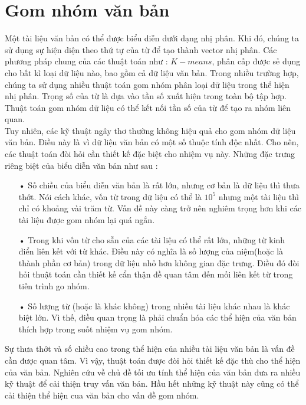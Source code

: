 \section{Gom nhóm văn bản}
\hspace{10mm}Một tài liệu văn bản có thể được biểu diễn dưới dạng nhị phân. Khi đó, chúng ta sử dụng sự hiện diện theo thứ tự của từ để tạo thành vector nhị phân. Các phương pháp chung của các thuật toán như : $K-means$, phân cấp được sẻ dụng cho bất kì loại dữ liệu nào, bao gồm cả dữ liệu văn bản. Trong nhiều trường hợp, chúng ta sử dụng nhiều thuật toán gom nhóm phân loại dữ liệu trong thể hiện nhị phân. Trọng số của từ là dựa vào tần số xuất hiện trong toàn bộ tập hợp. Thuật toán gom nhóm dữ liệu có thể kết nối tần số của từ để tạo ra nhóm liên quan.\\
\hspace*{10mm}Tuy nhiên, các kỹ thuật ngây thơ thường không hiệu quả cho gom nhóm dữ liệu văn bản. Điều này là vì dữ liệu văn bản có một số thuộc tính độc nhất. Cho nên, các thuật toán đòi hỏi cần thiết kế đặc biệt cho nhiệm vụ này. Những đặc trưng riêng biệt của biểu diễn văn bản như sau : 
\begin{enumerate}
\item[•]Số chiều của biểu diễn văn bản là rất lớn, nhưng cơ bản là dữ liệu thì thưa thớt. Nói cách khác, vốn từ trong dữ liệu có thể là $10^5$ nhưng một tài liệu thì chỉ có khoảng vài trăm từ. Vấn đề này càng trở nên nghiêm trọng hơn khi các tài liệu được gom nhóm lại quá ngắn.
\item[•]Trong khi vốn từ cho sẵn của các tài liệu có thể rất lớn, những từ kinh điển liên kết với từ khác. Điều này có nghĩa là số lượng của niệm(hoặc là thành phần cơ bản) trong dữ liệu nhỏ hơn không gian đặc trưng. Điều đó đòi hỏi thuật toán cần thiết kế cẩn thận đề quan tâm đến mối liên kết từ trong tiến trình go nhóm.
\item[•]Số lượng từ (hoặc là khác không) trong nhiều tài liệu khác nhau là khác biệt lớn. Vì thế, điều quan trọng là phải chuẩn hóa các thể hiện của văn bản thích hợp trong suốt nhiệm vụ gom nhóm.
\end{enumerate}
\hspace{10mm}Sự thưa thớt và số chiều cao trong thể hiện của nhiều tài liệu văn bản là vấn đề cần được quan tâm. Vì vậy, thuật toán được đòi hỏi thiết kế đặc thù cho thể hiện của văn bản. Nghiên cứu về chủ đề tối ưu tính thể hiện của văn bản đưa ra nhiều kỹ thuật để cải thiện truy vấn văn bản. Hầu hết những kỹ thuật này cũng có thể cải thiện thể hiện cua văn bản cho vấn đề gom nhóm.\\
